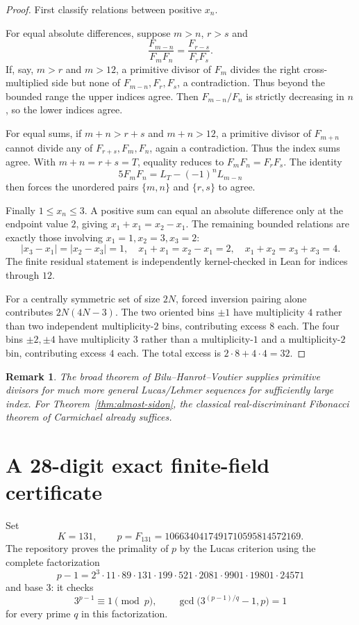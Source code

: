 \documentclass[11pt]{article}
\newtheorem{remark}[theorem]{Remark}
\begin{document}
\begin{proof}
First classify relations between positive $x_n$.

For equal absolute differences, suppose $m>n$, $r>s$ and
\[
\frac{F_{m-n}}{F_mF_n}=\frac{F_{r-s}}{F_rF_s}.
\]
If, say, $m>r$ and $m>12$, a primitive divisor of $F_m$ divides the right
cross-multiplied side but none of $F_{m-n},F_r,F_s$, a contradiction.  Thus
beyond the bounded range the upper indices agree.  Then
$F_{m-n}/F_n$ is strictly decreasing in $n$, so the lower indices agree.

For equal sums, if $m+n>r+s$ and $m+n>12$, a primitive divisor of
$F_{m+n}$ cannot divide any of $F_{r+s},F_m,F_n$, again a contradiction.
Thus the index sums agree.  With $m+n=r+s=T$, equality reduces to
$F_mF_n=F_rF_s$.  The identity
\[
5F_mF_n=L_T-(-1)^nL_{m-n}
\]
then forces the unordered pairs $\{m,n\}$ and $\{r,s\}$ to agree.

Finally $1\le x_n\le3$.  A positive sum can equal an absolute difference only
at the endpoint value $2$, giving $x_1+x_1=x_2-x_1$.  The remaining bounded
relations are exactly those involving
$x_1=1,x_2=3,x_3=2$:
\[
|x_3-x_1|=|x_2-x_3|=1,
\quad x_1+x_1=x_2-x_1=2,
\quad x_1+x_2=x_3+x_3=4.
\]
The finite residual statement is independently kernel-checked in Lean for
indices through $12$.

For a centrally symmetric set of size $2N$, forced inversion pairing alone
contributes $2N(4N-3)$.  The two oriented bins $\pm1$ have multiplicity $4$
rather than two independent multiplicity-$2$ bins, contributing excess $8$
each.  The four bins $\pm2,\pm4$ have multiplicity $3$ rather than a
multiplicity-$1$ and a multiplicity-$2$ bin, contributing excess $4$ each.
The total excess is $2\cdot8+4\cdot4=32$.
\end{proof}

\begin{remark}
The broad theorem of Bilu--Hanrot--Voutier \cite{BHV2001} supplies primitive
divisors for much more general Lucas/Lehmer sequences for sufficiently large
index.  For Theorem~\ref{thm:almost-sidon}, the classical real-discriminant
Fibonacci theorem of Carmichael already suffices.
\end{remark}

\section{A 28-digit exact finite-field certificate}

Set
\[
K=131,\qquad
p=F_{131}=1066340417491710595814572169.
\]
The repository proves the primality of $p$ by the Lucas criterion using the
complete factorization
\[
p-1=2^3\cdot11\cdot89\cdot131\cdot199\cdot521\cdot2081\cdot9901
\cdot19801\cdot24571
\]
and base $3$: it checks
\[
3^{p-1}\equiv1\pmod p,
\qquad
\gcd\bigl(3^{(p-1)/q}-1,p\bigr)=1
\]
for every prime $q$ in this factorization.
\end{document}
